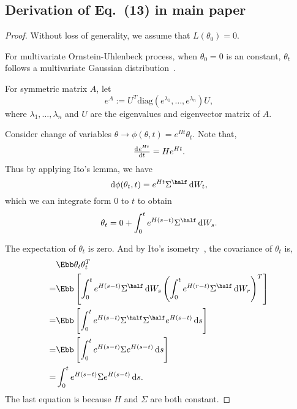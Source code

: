 \documentclass{article}
\begin{document}
\subsection{Derivation of Eq.~(13) in main paper}
\begin{proof}
Without loss of generality, we assume that $L(\theta_0) = 0$.

For multivariate Ornstein-Uhlenbeck process, when $\theta_0 = 0$ is an constant, $\theta_t$ follows a multivariate Gaussian distribution~\citep{oksendal2003stochastic}.

For symmetric matrix $A$, let
\begin{equation}
    e^{A} := U^T \text{diag}(e^{\lambda_1}, \dots, e^{\lambda_n}) U,
\end{equation}
where $\lambda_1, \dots, \lambda_n$ and $U$ are the eigenvalues and eigenvector matrix of $A$.

Consider change of variables $\theta \to \phi(\theta, t) = e^{Ht}\theta_t$.
Note that,
\begin{equation}
    \od{e^{Ht}}{t} = H e^{Ht}.
\end{equation}
Thus by applying Ito's lemma, we have
\begin{equation}
    \dif \phi(\theta_t, t) = e^{Ht}\Sigma^{\half} \dif W_t,
\end{equation}
which we can integrate form $0$ to $t$ to obtain
\begin{equation}
    \theta_t = 0 + \int_0^t e^{H(s-t)}\Sigma^{\half}\dif W_s.
\end{equation}

The expectation of $\theta_t$ is zero. And by Ito's isometry~\citep{oksendal2003stochastic}, the covariance of $\theta_t$ is,
\begin{align}
    &\Ebb \theta_t \theta_t^T \\
    =& \Ebb \left[\int_0^t e^{H(s-t)}\Sigma^{\half} \dif W_s \left(\int_0^t e^{H(r-t)}\Sigma^{\half} \dif W_r\right)^T\right] \\
    =& \Ebb \left[\int_0^t e^{H(s-t)}\Sigma^{\half}\Sigma^{\half}e^{H(s-t)}\dif s \right] \\
    =& \Ebb \left[\int_0^t e^{H(s-t)}\Sigma e^{H(s-t)}\dif s \right] \\
    =& \int_0^t e^{H(s-t)}\Sigma e^{H(s-t)}\dif s. 
\end{align}
The last equation is because $H$ and $\Sigma$ are both constant.


\end{proof}
\end{document}
